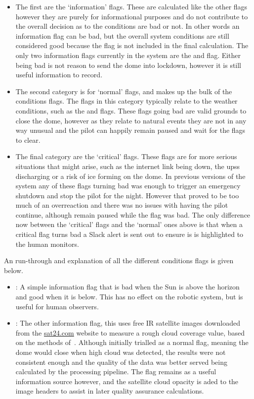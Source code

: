 \begin{colsection}
\begin{colsection}
\begin{itemize}
    \item The first are the `information' flags. These are calculated like the other flags however they are purely for informational purposes and do not contribute to the overall decision as to the conditions are bad or not. In other words an information flag can be bad, but the overall system conditions are still considered good because the flag is not included in the final calculation. The only two information flags currently in the system are the  and  flag. Either being bad is not reason to send the dome into lockdown, however it is still useful information to record.
    \item The second category is for `normal' flags, and makes up the bulk of the conditions flags. The flags in this category typically relate to the weather conditions, such as the  and  flags. These flags going bad are valid grounds to close the dome, however as they relate to natural events they are not in any way unusual and the pilot can happily remain paused and wait for the flags to clear.
    \item The final category are the `critical' flags. These flags are for more serious situations that might arise, such as the internet link being down, the \glspl{ups} discharging or a risk of ice forming on the dome. In previous versions of the system any of these flags turning bad was enough to trigger an emergency shutdown and stop the pilot for the night. However that proved to be too much of an overreaction and there was no issues with having the pilot continue, although remain paused while the flag was bad. The only difference now between the `critical' flags and the `normal' ones above is that when a critical flag turns bad a Slack alert is sent out to ensure is is highlighted to the human monitors.
\end{itemize}

An run-through and explanation of all the different conditions flags is given below.

\begin{itemize}
\item {}: A simple information flag that is bad when the Sun is above the horizon and good when it is below. This has no effect on the robotic system, but is useful for human observers.

\item {}: The other information flag, this uses free IR satellite images downloaded from the \url{sat24.com} website to measure a rough cloud coverage value, based on the methods of~\cite{clouds}. Although initially trialled as a normal flag, meaning the dome would close when high cloud was detected, the results were not consistent enough and the quality of the data was better served being calculated by the processing pipeline. The flag remains as a useful information source however, and the satellite cloud opacity is aded to the image headers to assist in later quality assurance calculations.


\end{itemize}
\end{colsection}
\end{colsection}
